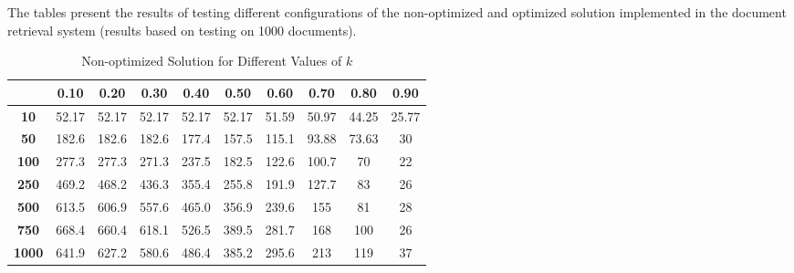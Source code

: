 \documentclass[12pt,a4paper]{article}
\begin{document}
The tables present the results of testing different configurations of the non-optimized and optimized solution implemented in the document retrieval system (results based on testing on 1000 documents).
\newpage

\begin{table}[h!]
    \centering
    \setlength{\arrayrulewidth}{0.5mm} %
    \renewcommand{\arraystretch}{1.5} %
    \begin{tabular}{|c|c|c|c|c|c|c|c|c|c|}
    \hline
    \rowcolor{black!75} %
    & \color{white}\textbf{0.10} & \color{white}\textbf{0.20} & \color{white}\textbf{0.30} & \color{white}\textbf{0.40} & \color{white}\textbf{0.50} & \color{white}\textbf{0.60} & \color{white}\textbf{0.70} & \color{white}\textbf{0.80} & \color{white}\textbf{0.90} \\ \hline
    \cellcolor{black!75}\color{white}\textbf{10} & 52.17 & 52.17 & 52.17 & 52.17 & 52.17 & 51.59 & 50.97 & 44.25 & 25.77 \\ \hline
    \cellcolor{black!75}\color{white}\textbf{50} & 182.6 & 182.6 & 182.6 & 177.4 & 157.5 & 115.1 & 93.88 & 73.63 & 30 \\ \hline
    \cellcolor{black!75}\color{white}\textbf{100} & 277.3 & 277.3 & 271.3 & 237.5 & 182.5 & 122.6 & 100.7 & 70 & 22 \\ \hline
    \cellcolor{black!75}\color{white}\textbf{250} & 469.2 & 468.2 & 436.3 & 355.4 & 255.8 & 191.9 & 127.7 & 83 & 26 \\ \hline
    \cellcolor{black!75}\color{white}\textbf{500} & 613.5 & 606.9 & 557.6 & 465.0 & 356.9 & 239.6 & 155 & 81 & 28 \\ \hline
    \cellcolor{black!75}\color{white}\textbf{750} & 668.4 & 660.4 & 618.1 & 526.5 & 389.5 & 281.7 & 168 & 100 & 26 \\ \hline
    \cellcolor{black!75}\color{white}\textbf{1000} & 641.9 & 627.2 & 580.6 & 486.4 & 385.2 & 295.6 & 213 & 119 & 37 \\ \hline
    \end{tabular}
    \caption{Non-optimized Solution for Different Values of $k$}
\end{table}
\end{document}

